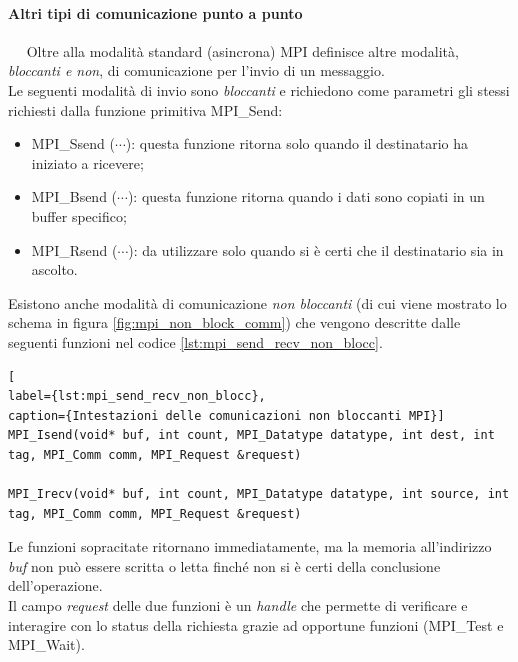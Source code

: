 \paragraph{Altri tipi di comunicazione punto a punto}~\newline~\newline
Oltre alla modalità standard (asincrona) MPI definisce altre modalità, \textit{bloccanti e non}, di comunicazione per l’invio di un messaggio.\\
Le seguenti modalità di invio sono \emph{bloccanti} e richiedono come parametri gli stessi richiesti dalla funzione primitiva MPI\_Send:
\begin{itemize}
	\item MPI\_Ssend ($\cdots$): questa funzione ritorna solo quando il destinatario ha iniziato a ricevere;
	\item MPI\_Bsend ($\cdots$): questa funzione ritorna quando i dati sono copiati in un buffer specifico;
	\item MPI\_Rsend ($\cdots$): da utilizzare solo quando si è certi che il destinatario sia in ascolto.
\end{itemize}
Esistono anche modalità di comunicazione \emph{non bloccanti} (di cui viene mostrato lo schema in figura \ref{fig:mpi_non_block_comm}) che vengono descritte dalle seguenti funzioni nel codice \ref{lst:mpi_send_recv_non_blocc}.\\
\begin{lstlisting}[ 
label={lst:mpi_send_recv_non_blocc},
caption={Intestazioni delle comunicazioni non bloccanti MPI}]
MPI_Isend(void* buf, int count, MPI_Datatype datatype, int dest, int tag, MPI_Comm comm, MPI_Request &request)

MPI_Irecv(void* buf, int count, MPI_Datatype datatype, int source, int tag, MPI_Comm comm, MPI_Request &request)
\end{lstlisting}
Le funzioni sopracitate ritornano immediatamente, ma la memoria all’indirizzo \textit{buf} non può essere scritta o letta finché non si è certi della conclusione dell’operazione.\\
Il campo \textit{request} delle due funzioni è un \textit{handle} che permette di verificare e interagire con lo status della richiesta grazie ad opportune funzioni (MPI\_Test e MPI\_Wait).
